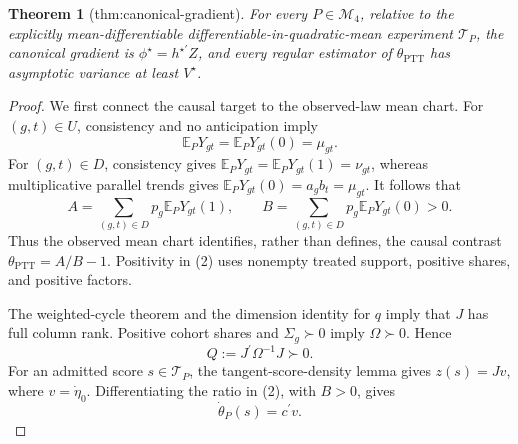\documentclass{article}
\newtheorem{theorem}{Theorem}
\begin{document}
\begin{theorem}[thm:canonical-gradient]\label{thm:canonical-gradient}
For every \(P\in\mathcal M_4\), relative to the explicitly mean-differentiable differentiable-in-quadratic-mean experiment \(\mathcal T_P\), the canonical gradient is \(\phi^{\star}=h^{\star\prime}Z\), and every regular estimator of \(\theta_{\mathrm{PTT}}\) has asymptotic variance at least \(V^{\star}\).
\end{theorem}
\begin{proof}
We first connect the causal target to the observed-law mean chart.  For \((g,t)\in U\), consistency and no anticipation imply
\[
\mathbb E_PY_{gt}=\mathbb E_PY_{gt}(0)=\mu_{gt}.                        \tag{1}
\]
For \((g,t)\in D\), consistency gives
\(\mathbb E_PY_{gt}=\mathbb E_PY_{gt}(1)=\nu_{gt}\), whereas multiplicative parallel trends gives
\(\mathbb E_PY_{gt}(0)=a_gb_t=\mu_{gt}\).  It follows that
\[
A=\sum_{(g,t)\in D}p_g\mathbb E_PY_{gt}(1),
\qquad
B=\sum_{(g,t)\in D}p_g\mathbb E_PY_{gt}(0)>0.                           \tag{2}
\]
Thus the observed mean chart identifies, rather than defines, the causal contrast
\(\theta_{\mathrm{PTT}}=A/B-1\).  Positivity in (2) uses nonempty treated support, positive shares, and positive factors.

The weighted-cycle theorem and the dimension identity for \(q\) imply that \(J\) has full column rank.  Positive cohort shares and \(\Sigma_g\succ0\) imply
\(\Omega\succ0\).  Hence
\[
Q:=J^{\prime}\Omega^{-1}J\succ0.                                      \tag{3}
\]
For an admitted score \(s\in\mathcal T_P\), the tangent-score-density lemma gives
\(z(s)=Jv\), where \(v=\dot\eta_0\).  Differentiating the ratio in (2), with \(B>0\), gives
\[
\dot\theta_P(s)=c^{\prime}v.                                          \tag{4}
\]


\end{proof}
\end{document}
